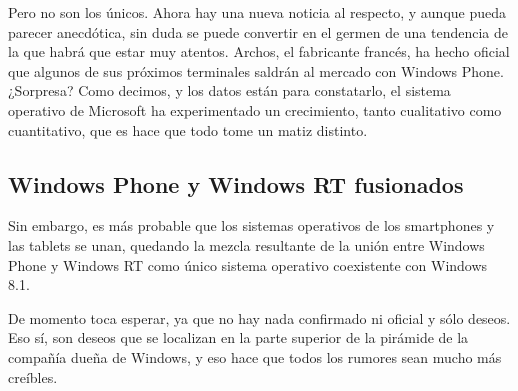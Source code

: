 Pero no son los únicos. Ahora hay una nueva noticia al respecto, y aunque pueda parecer anecdótica, sin duda se puede convertir en el germen de una tendencia de la que 
habrá que estar muy atentos. Archos, el fabricante francés, ha hecho oficial que algunos de sus próximos terminales saldrán al mercado con Windows Phone. ¿Sorpresa? Como 
decimos, y los datos están para constatarlo, el sistema operativo de Microsoft ha experimentado un crecimiento, tanto cualitativo como cuantitativo, que es hace que todo 
tome un matiz distinto.

\subsection*{Windows Phone y Windows RT fusionados}
Sin embargo, es más probable que los sistemas operativos de los smartphones y las tablets se unan, quedando la mezcla resultante de la unión entre Windows Phone y Windows 
RT como único sistema operativo coexistente con Windows 8.1.

De momento toca esperar, ya que no hay nada confirmado ni oficial y sólo deseos. Eso sí, son deseos que se localizan en la parte superior de la pirámide de la compañía 
dueña de Windows, y eso hace que todos los rumores sean mucho más creíbles.